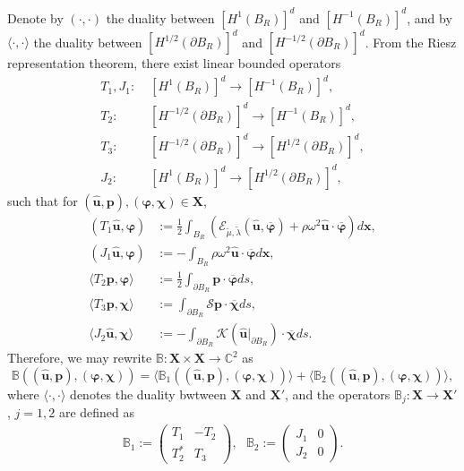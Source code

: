 \documentclass[final,reqno]{siamltex}
\newcommand{\om}{\omega}
\newcommand{\pa}{\partial}
\newcommand{\ov}{\overline}
\newcommand{\mat}{\mathbb}
\newcommand{\C}{{\mat C}}
\begin{document}
Denote by $(\cdot,\cdot)$ the duality between $[H^1(B_R)]^d$ and $[H^{-1}(B_R)]^d$, and by $\langle\cdot,\cdot\rangle$ the duality between $[H^{1/2}(\pa B_R)]^d$ and $[H^{-1/2}(\pa B_R)]^d$. From the Riesz representation theorem, there exist linear bounded operators 
  \begin{align*}
  	T_1,J_1:&\;[H^1(B_R)]^d\rightarrow[H^{-1}(B_R)]^d, \\
  T_2:&\;[H^{-1/2}(\pa B_R)]^d\rightarrow[H^{-1}(B_R)]^d, \\
  T_3:&\;[H^{-1/2}(\pa B_R)]^d\rightarrow[H^{1/2}(\pa B_R)]^d, \\
  J_2:&\;[H^1(B_R)]^d\rightarrow[H^{1/2}(\pa B_R)]^d, 
  \end{align*}
such that for $(\mathbf{\hat u},\mathbf{p}),(\boldsymbol{\varphi},\boldsymbol{\chi})\in\mathbf{X}$, 
  \begin{align*}
  	(T_1\mathbf{\hat u},\boldsymbol{\varphi})&:=\frac{1}{2}\int_{B_R}\left(\mathcal{E}_{\tilde{\mu},\tilde{\lambda}}(\mathbf{\hat u},\ov{\boldsymbol{\varphi}})+\rho\om^2\mathbf{\hat u}\cdot\ov{\boldsymbol{\varphi}}\right)d\mathbf{x}, \\
  (J_1\mathbf{\hat u},\boldsymbol{\varphi})&:=-\int_{B_R}\rho\om^2\mathbf{\hat u}\cdot\ov{\boldsymbol{\varphi}}d\mathbf{x}, \\
  \langle T_2\mathbf{p},\boldsymbol{\varphi}\rangle&:=\frac{1}{2}\int_{\pa B_R}\mathbf{p}\cdot\ov{\boldsymbol{\varphi}}ds, \\
  \langle T_3\mathbf{p},\boldsymbol{\chi}\rangle&:=\int_{\pa B_R}\mathcal{S}\mathbf{p}\cdot\ov{\boldsymbol{\chi}}ds, \\
  \langle J_2\mathbf{\hat u},\boldsymbol{\chi}\rangle&:=-\int_{\pa B_R}\mathcal{K}(\mathbf{\hat u}|_{\pa B_R})\cdot\ov{\boldsymbol{\chi}}ds. 
  \end{align*}
Therefore, we may rewrite $\mathbb{B}:\mathbf{X}\times\mathbf{X}\rightarrow\C^2$ as 
$$
  \mathbb{B}((\mathbf{\hat u},\mathbf{p}),(\boldsymbol{\varphi},\boldsymbol{\chi}))=\langle\mathbb{B}_1((\mathbf{\hat u},\mathbf{p}),(\boldsymbol{\varphi},\boldsymbol{\chi}))\rangle+\langle\mathbb{B}_2((\mathbf{\hat u},\mathbf{p}),(\boldsymbol{\varphi},\boldsymbol{\chi}))\rangle, 
$$
where $\langle\cdot,\cdot\rangle$ denotes the duality bwtween $\mathbf{X}$ and $\mathbf{X}'$, and the operators $\mathbb{B}_j:\mathbf{X}\rightarrow\mathbf{X}'$, $j=1,2$ are defined as 
\begin{align*}
\mathbb{B}_1:=
\left(
\begin{array}{cc}
	T_1 & -T_2 \\
	T_2^* & T_3 
\end{array}
\right)
,~~~\mathbb{B}_2:=
\left(
\begin{array}{cc}
	J_1 & 0 \\
	J_2 & 0 
\end{array}
\right). 
\end{align*}
\end{document}
